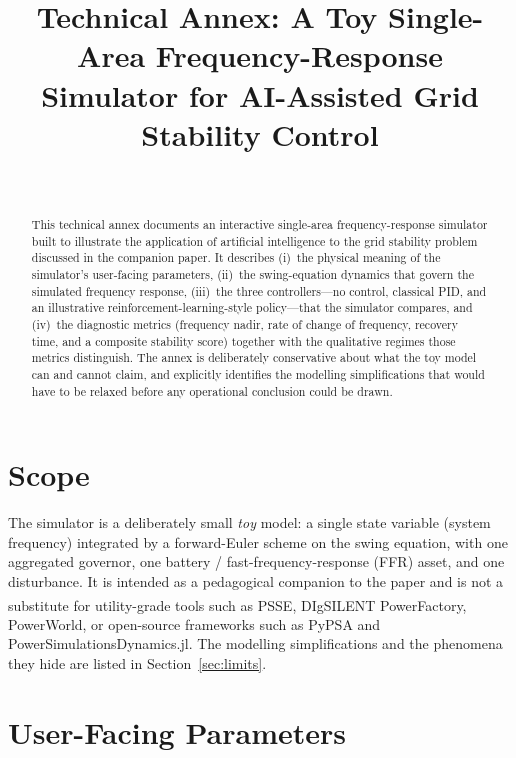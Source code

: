 \documentclass[conference]{IEEEtran}
\title{Technical Annex: A Toy Single-Area Frequency-Response\\
Simulator for AI-Assisted Grid Stability Control}
\author{\IEEEauthorblockN{Judith Drack}\\
\IEEEauthorblockA{Companion to ``Power System Stability in a Decarbonising Europe''}}
\begin{document}
\maketitle

\begin{abstract}
This technical annex documents an interactive single-area frequency-response simulator built to illustrate the application of artificial intelligence to the grid stability problem discussed in the companion paper. It describes (i)~the physical meaning of the simulator's user-facing parameters, (ii)~the swing-equation dynamics that govern the simulated frequency response, (iii)~the three controllers---no control, classical PID, and an illustrative reinforcement-learning-style policy---that the simulator compares, and (iv)~the diagnostic metrics (frequency nadir, rate of change of frequency, recovery time, and a composite stability score) together with the qualitative regimes those metrics distinguish. The annex is deliberately conservative about what the toy model can and cannot claim, and explicitly identifies the modelling simplifications that would have to be relaxed before any operational conclusion could be drawn.
\end{abstract}

\section{Scope}
The simulator is a deliberately small \emph{toy} model: a single state variable (system frequency) integrated by a forward-Euler scheme on the swing equation, with one aggregated governor, one battery / fast-frequency-response (FFR) asset, and one disturbance. It is intended as a pedagogical companion to the paper and is not a substitute for utility-grade tools such as PSS\textsuperscript{\textregistered}E, DIgSILENT PowerFactory, PowerWorld, or open-source frameworks such as PyPSA and PowerSimulationsDynamics.jl. The modelling simplifications and the phenomena they hide are listed in Section~\ref{sec:limits}.

\section{User-Facing Parameters}\label{sec:params}
\end{document}
